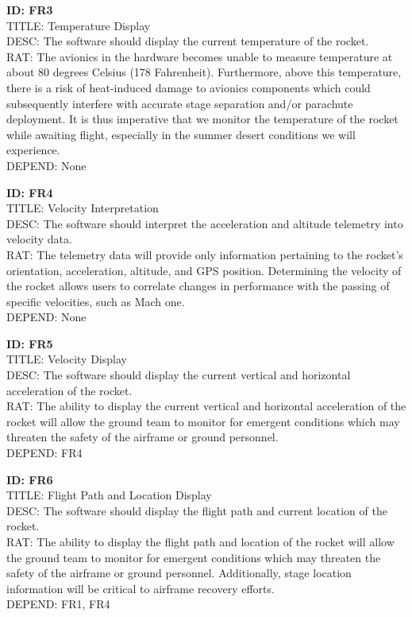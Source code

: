 \documentclass[onecolumn, draftclsnofoot,10pt, compsoc]{IEEEtran}
\begin{document}
      \noindent
			\textbf{ID: FR3}\\
			TITLE: Temperature Display\\
			DESC: The software should display the current temperature of the rocket.\\
			RAT: The avionics in the hardware becomes unable to measure temperature at about 80 degrees Celsius (178 Fahrenheit). 
        Furthermore, above this temperature, there is a risk of heat-induced damage to avionics components which could subsequently interfere with accurate stage separation and/or parachute deployment.
        It is thus imperative that we monitor the temperature of the rocket while awaiting flight, especially in the summer desert conditions we will experience.\\
			DEPEND: None
			
			\noindent
			\textbf{ID: FR4}\\
			TITLE: Velocity Interpretation\\
			DESC: The software should interpret the acceleration and altitude telemetry into velocity data.\\
			RAT: The telemetry data will provide only information pertaining to the rocket's orientation, acceleration, altitude, and GPS position.
				Determining the velocity of the rocket allows users to correlate changes in performance with the passing of specific velocities, such as Mach one.\\
			DEPEND: None
			
			\noindent
			\textbf{ID: FR5}\\
			TITLE: Velocity Display\\
			DESC: The software should display the current vertical and horizontal acceleration of the rocket.\\
			RAT: The ability to display the current vertical and horizontal acceleration of the rocket will allow the ground team to monitor for emergent conditions which may threaten the safety of the airframe or ground personnel.\\
			DEPEND: FR4
			
			\noindent
			\textbf{ID: FR6}\\
			TITLE: Flight Path and Location Display\\
			DESC: The software should display the flight path and current location of the rocket.\\
			RAT: The ability to display the flight path and location of the rocket will allow the ground team to monitor for emergent conditions which may threaten the safety of the airframe or ground personnel.
				Additionally, stage location information will be critical to airframe recovery efforts.\\
			DEPEND: FR1, FR4
			
\end{document}
